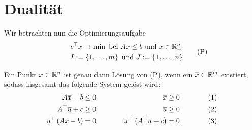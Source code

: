 \section{Dualität}

Wir betrachten nun die Optimierungsaufgabe
\begin{equation*}
	\begin{aligned}
		\qquad &c^{\top} x \to \min \text{ bei } Ax \le b \text{ und } x \in \mathbb{R}^n_+ \\
		&I \mathrel{:=} \left\{ 1, \dots, m \right\} \text{ und } J \mathrel{:=} \left\{ 1, \dots, n \right\}
	\end{aligned} \tag{P}
	\label{eq: P}
\end{equation*}

\begin{satz}[Charakterisierungssatz] %
	Ein Punkt $x \in \mathbb{R}^n$ ist genau dann Lösung von (P), wenn ein $\overline{x} \in \mathbb{R}^m$ existiert, sodass insgesamt das folgende System gelöst wird:
	\begin{equation*}
		\begin{alignedat}{3}
			A \overline{x} - b &\le 0 \quad &\overline{x} &\ge 0 \qquad \qquad &(1) \\
			A^{\top} \overline{u} + c &\ge 0 \quad &\overline{u} &\ge 0 &(2) \\
			\overline{u}^{\top} \left( A \overline{x} - b \right) &= 0 \qquad \qquad &\overline{x}^{\top} \left( A^{\top}\overline{u} + c \right) &= 0 &(3)
		\end{alignedat}
	\end{equation*}
\end{satz}
